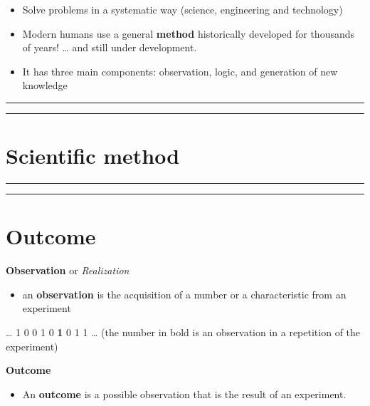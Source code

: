 \documentclass[
]{book}
\providecommand{\tightlist}{%
  \setlength{\itemsep}{0pt}\setlength{\parskip}{0pt}}
\begin{document}
\begin{itemize}
\item
  Solve problems in a systematic way (science, engineering and technology)
\item
  Modern humans use a general \textbf{method} historically developed for thousands of years! \ldots{} and still under development.
\item
  It has three main components: observation, logic, and generation of new knowledge
\end{itemize}

\begin{center}\rule{0.5\linewidth}{0.5pt}\end{center}

\begin{center}\rule{0.5\linewidth}{0.5pt}\end{center}

\hypertarget{scientific-method}{%
\section{Scientific method}\label{scientific-method}}

\begin{center}\rule{0.5\linewidth}{0.5pt}\end{center}

\begin{center}\rule{0.5\linewidth}{0.5pt}\end{center}

\hypertarget{outcome}{%
\section{Outcome}\label{outcome}}

\textbf{Observation} or \emph{Realization}

\begin{itemize}
\tightlist
\item
  an \textbf{observation} is the acquisition of a number or a characteristic from an experiment
\end{itemize}

\ldots{} 1 0 0 1 0 \textbf{1} 0 1 1 \ldots{} (the number in bold is an observation in a repetition of the experiment)

\textbf{Outcome}

\begin{itemize}
\tightlist
\item
  An \textbf{outcome} is a possible observation that is the result of an experiment.
\end{itemize}
\end{document}
